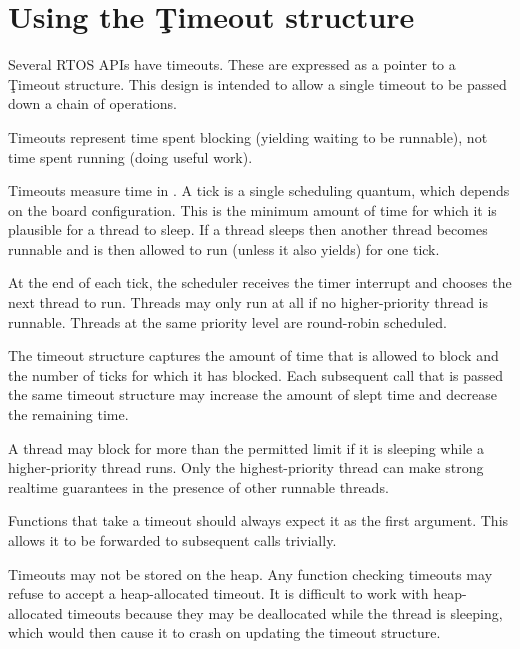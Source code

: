 
\section{Using the \c{Timeout} structure}

Several RTOS APIs have timeouts.
These are expressed as a pointer to a \c{Timeout} structure.
This design is intended to allow a single timeout to be passed down a chain of operations.

\begin{note}
Timeouts represent time spent blocking (yielding waiting to be runnable), not time spent running (doing useful work).
\end{note}

Timeouts measure time in .
A tick is a single scheduling quantum, which depends on the board configuration.
This is the minimum amount of time for which it is plausible for a thread to sleep.
If a thread sleeps then another thread becomes runnable and is then allowed to run (unless it also yields) for one tick.

At the end of each tick, the scheduler receives the timer interrupt and chooses the next thread to run.
Threads may only run at all if no higher-priority thread is runnable.
Threads at the same priority level are round-robin scheduled.

The timeout structure captures the amount of time that is allowed to block and the number of ticks for which it has blocked.
Each subsequent call that is passed the same timeout structure may increase the amount of slept time and decrease the remaining time.

\begin{note}
A thread may block for more than the permitted limit if it is sleeping while a higher-priority thread runs.
Only the highest-priority thread can make strong realtime guarantees in the presence of other runnable threads.
\end{note}

Functions that take a timeout should always expect it as the first argument.
This allows it to be forwarded to subsequent calls trivially.

\begin{warning}
Timeouts may not be stored on the heap.
Any function checking timeouts may refuse to accept a heap-allocated timeout.
It is difficult to work with heap-allocated timeouts because they may be deallocated while the thread is sleeping, which would then cause it to crash on updating the timeout structure.
\end{warning}

